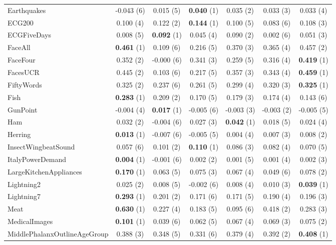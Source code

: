 \begin{table}[ht]
\begin{adjustbox}{width=\textwidth}
\begin{tabular}{lcccccc}
    Earthquakes & -0.043 (6) & 0.015 (5) & \textbf{0.040} (1) & 0.035 (2) & 0.033 (3) & 0.033 (4) \\
    ECG200 & 0.100 (4) & 0.122 (2) & \textbf{0.144} (1) & 0.100 (5) & 0.083 (6) & 0.108 (3) \\
    ECGFiveDays & 0.008 (5) & \textbf{0.092} (1) & 0.045 (4) & 0.090 (2) & 0.002 (6) & 0.051 (3) \\
    FaceAll & \textbf{0.461} (1) & 0.109 (6) & 0.216 (5) & 0.370 (3) & 0.365 (4) & 0.457 (2) \\
    FaceFour & 0.352 (2) & -0.000 (6) & 0.341 (3) & 0.259 (5) & 0.316 (4) & \textbf{0.419} (1) \\
    FacesUCR & 0.445 (2) & 0.103 (6) & 0.217 (5) & 0.357 (3) & 0.343 (4) & \textbf{0.459} (1) \\
    FiftyWords & 0.325 (2) & 0.237 (6) & 0.261 (5) & 0.299 (4) & 0.320 (3) & \textbf{0.325} (1) \\
    Fish & \textbf{0.283} (1) & 0.209 (2) & 0.170 (5) & 0.179 (3) & 0.174 (4) & 0.143 (6) \\
    GunPoint & -0.004 (4) & \textbf{0.017} (1) & -0.005 (6) & -0.003 (3) & -0.003 (2) & -0.005 (5) \\
    Ham & 0.032 (2) & -0.004 (6) & 0.027 (3) & \textbf{0.042} (1) & 0.018 (5) & 0.024 (4) \\
    Herring & \textbf{0.013} (1) & -0.007 (6) & -0.005 (5) & 0.004 (4) & 0.007 (3) & 0.008 (2) \\
    InsectWingbeatSound & 0.057 (6) & 0.101 (2) & \textbf{0.110} (1) & 0.086 (3) & 0.082 (4) & 0.070 (5) \\
    ItalyPowerDemand & \textbf{0.004} (1) & -0.001 (6) & 0.002 (2) & 0.001 (5) & 0.001 (4) & 0.002 (3) \\
    LargeKitchenAppliances & \textbf{0.170} (1) & 0.063 (5) & 0.075 (3) & 0.067 (4) & 0.049 (6) & 0.078 (2) \\
    Lightning2 & 0.025 (2) & 0.008 (5) & -0.002 (6) & 0.008 (4) & 0.010 (3) & \textbf{0.039} (1) \\
    Lightning7 & \textbf{0.293} (1) & 0.201 (2) & 0.171 (6) & 0.171 (5) & 0.190 (4) & 0.196 (3) \\
    Meat & \textbf{0.630} (1) & 0.227 (4) & 0.183 (5) & 0.095 (6) & 0.418 (2) & 0.283 (3) \\
    MedicalImages & \textbf{0.101} (1) & 0.039 (6) & 0.062 (5) & 0.067 (4) & 0.069 (3) & 0.075 (2) \\
    MiddlePhalanxOutlineAgeGroup & 0.388 (3) & 0.348 (5) & 0.331 (6) & 0.379 (4) & 0.392 (2) & \textbf{0.408} (1) \\

\end{tabular}
\end{adjustbox}
\end{table}

